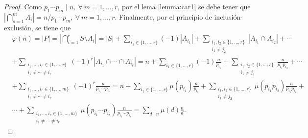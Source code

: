 \begin{proof}
Como $p_1 \cdots p_m \mid n,\:\forall \: m=1,\ldots,r$, por el lema \eqref{lemma:car1} se debe tener que  $|\bigcap_{s=1}^{m} A_i|=n/p_1 \cdots p_m,\:\forall \: m=1,\ldots,r$. Finalmente, por el principio de inclusión-exclusión, se tiene que 
\begin{align*}
	&\varphi(n) = |P| = \left|\bigcap_{i=1}^{r} S \setminus A_i\right| = |S|+\sum_{i_1\in \{1,\ldots,r\}} (-1)|A_{i_1}|+\sum_{\substack{i_1,i_2\in \{1,\ldots,r\} \\ i_1\neq j_2}} |A_{i_1} \cap A_{i_2}|+\cdots \\
	&+\sum_{\substack{i_1,\ldots,i_r\in \{1,\ldots,r\} \\ i_1\neq \cdots \neq i_r}} (-1)^{r}|A_{i_1}\cap \cdots\cap A_{i_r}| = n+\sum_{i_1\in \{1,\ldots,r\}} (-1)\frac{n}{p_{i_1}}+\sum_{\substack{i_1,i_2\in \{1,\ldots,r\} \\ i_1\neq j_2}} \frac{n}{p_{i_1}p_{i_2}} +\cdots \\
	&+\sum_{\substack{i_1,\ldots,i_r\in \{1,\ldots,m\} \\ i_1\neq \cdots \neq i_r}} (-1)^{r}\frac{n}{p_{i_1}\cdots p_{i_r}} = n+\sum_{i_1\in \{1,\ldots,r\}} \mu(p_{i_1})\frac{n}{p_{i_1}}+\sum_{\substack{i_1,i_2\in \{1,\ldots,r\} \\ i_1\neq j_2}} \mu(p_{i_1}p_{i_2})\frac{n}{p_{i_1}p_{i_2}} + \\
	&\cdots+\sum_{\substack{i_1,\ldots,i_r\in \{1,\ldots,m\} \\ i_1\neq \cdots \neq i_r}} \mu(p_{i_1}\cdots p_{i_r})\frac{n}{p_{i_1}\cdots p_{i_r}} = \sum_{d \mid n} \mu(d)\frac{n}{d}.
\end{align*}
\end{proof}
